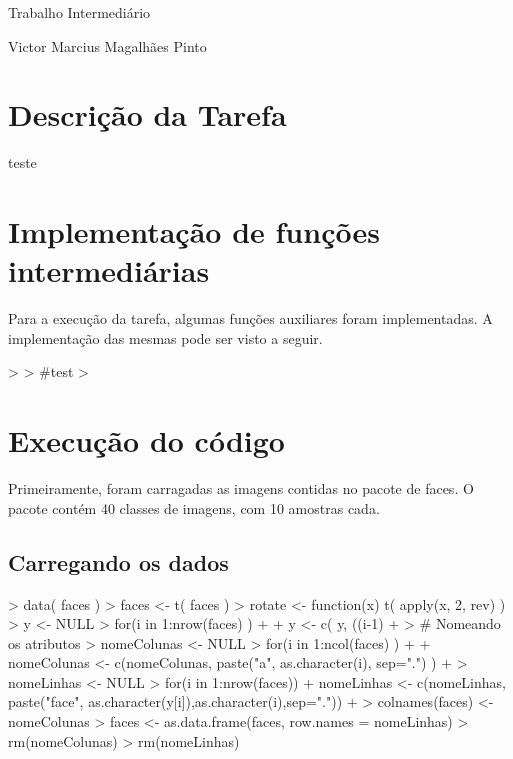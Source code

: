 \documentclass[12pt,a4paper,titlepage]{article}
\begin{document}


\begin{center}
{\huge Trabalho Intermediário}

{\large Victor Marcius Magalhães Pinto}
\end{center}

\section{Descrição da Tarefa}

teste


\section{Implementação de funções intermediárias}

Para a execução da tarefa, algumas funções auxiliares foram implementadas. A implementação das mesmas pode ser visto a seguir.

\begin{Schunk}
\begin{Sinput}
> 
> #test
> 
\end{Sinput}
\end{Schunk}

\section{Execução do código}

Primeiramente, foram carragadas as imagens contidas no pacote de faces. O pacote contém 40 classes de imagens, com 10 amostras cada.

\subsection{Carregando os dados}

\begin{Schunk}
\begin{Sinput}
> data( faces )
> faces <- t( faces )
> rotate <- function(x) t( apply(x, 2, rev) )
> y <- NULL
> for(i in 1:nrow(faces) )
+ {
+     y <- c( y, ((i-1) %/% 10) + 1 )
+ }
> # Nomeando os atributos
> nomeColunas <- NULL
> for(i in 1:ncol(faces) )
+ {
+     nomeColunas <- c(nomeColunas, paste("a", as.character(i), sep=".") )
+ }
> nomeLinhas <- NULL
> for(i in 1:nrow(faces)) {
+     nomeLinhas <- c(nomeLinhas, paste("face", as.character(y[i]),as.character(i),sep="."))
+ }
> colnames(faces) <- nomeColunas
> faces <- as.data.frame(faces, row.names = nomeLinhas)
> rm(nomeColunas)
> rm(nomeLinhas)
\end{Sinput}
\end{Schunk}
\end{document}
